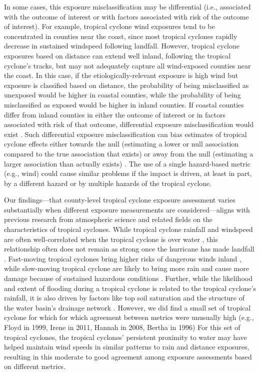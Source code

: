 In some cases, this exposure misclassification may be differential (i.e.,
associated with the outcome of interest or with factors associated with risk of
the outcome of interest). For example, tropical cyclone wind exposures tend to
be concentrated in counties near the coast, since most tropical cyclones
rapidly decrease in sustained windspeed following landfall. However, tropical
cyclone exposures based on distance can extend well inland, following the
tropical cyclone's tracks, but may not adequately capture all wind-exposed
counties near the coast. In this case, if the etiologically-relevant exposure
is high wind but exposure is classified based on distance, the probability of
being misclassified as unexposed would be higher in coastal counties, while the
probability of being misclassified as exposed would be higher in inland
counties. If coastal counties differ from inland counties in either the outcome
of interest or in factors associated with risk of that outcome, differential
exposure misclassification would exist \citep{savitz2016interpreting}. Such
differential exposure misclassification can bias estimates of tropical cyclone
effects either towards the null (estimating a lower or null association
compared to the true association that exists) or away from the null (estimating
a larger association than actually exists) \citep{savitz2016interpreting,
armstrong1998effect}. The use of a single hazard-based metric (e.g., wind)
could cause similar problems if the impact is driven, at least in part, by a
different hazard or by multiple hazards of the tropical cyclone.

Our findings---that county-level tropical cyclone exposure assessment varies
substantially when different exposure measurements are considered---aligns with
previous research from atmospheric science and related fields on the
characteristics of tropical cyclones. While tropical cyclone rainfall and
windspeed are often well-correlated when the tropical cyclone is over water
\citep{cerveny2000}, this relationship often does not remain as strong once the
hurricane has made landfall \citep{jiang2008}.  Fast-moving tropical cyclones
bring higher risks of dangerous winds inland \citep{kruk2010}, while
slow-moving tropical cyclone are likely to bring more rain
\citep{rappaport2000} and cause more damage because of sustained hazardous
conditions \citep{rezapour2014}. Further, while the likelihood and extent of
flooding during a tropical cyclone is related to the tropical cyclone's
rainfall, it is also driven by factors like top soil saturation and the
structure of the water basin's drainage network \citep{chen2015, rees2001}.
However, we did find a small set of tropical cyclone for which for which
agreement between metrics were unusually high (e.g., Floyd in 1999, Irene in
2011, Hannah in 2008, Bertha in 1996) For this set of tropical cyclones, the
tropical cyclones' persistent proximity to water may have helped maintain wind
speeds in similar patterns to rain and distance exposures, resulting in this
moderate to good agreement among exposure assessments based on different
metrics. 

